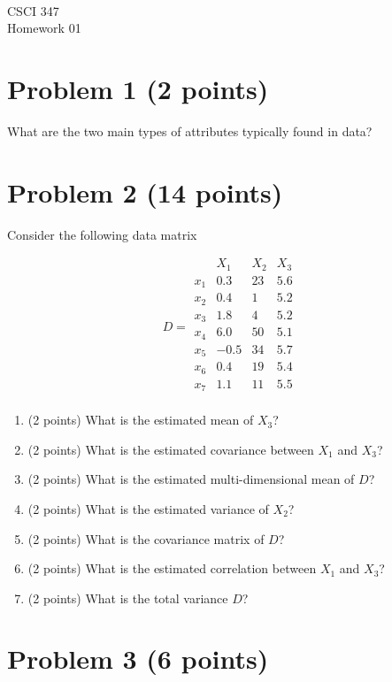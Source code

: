 \documentclass[11pt]{article}
\newcommand{\course}{CSCI 347}
\newcommand{\proj}{Homework 01}
\begin{document}
{ ~\\
    \course \\ 
    \proj \\ 
}

\section*{Problem 1 (2 points)}

What are the two main types of attributes typically found in data?

\section*{Problem 2 (14 points)}

Consider the following data matrix

$$
    D = \begin{matrix}
            & X_1   & X_2   & X_3 \\
        x_1 &  0.3  & 23    & 5.6 \\
        x_2 &  0.4  &  1    & 5.2 \\
        x_3 &  1.8  &  4    & 5.2 \\
        x_4 &  6.0  & 50    & 5.1 \\
        x_5 & -0.5  & 34    & 5.7 \\
        x_6 &  0.4  & 19    & 5.4 \\
        x_7 &  1.1  & 11    & 5.5 \\
    \end{matrix}
$$

\begin{enumerate}
    \item (2 points) What is the estimated mean of $X_3$?
    \item (2 points) What is the estimated covariance between $X_1$ and $X_3$?
    \item (2 points) What is the estimated multi-dimensional mean of $D$?
    \item (2 points) What is the estimated variance of $X_2$?
    \item (2 points) What is the covariance matrix of $D$?
    \item (2 points) What is the estimated correlation between $X_1$ and $X_3$?
    \item (2 points) What is the total variance $D$?
\end{enumerate}

\section*{Problem 3 (6 points)}
\end{document}
